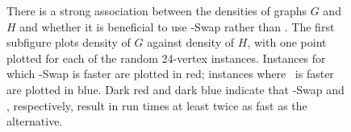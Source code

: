 \begin{figure}[h!]
    \centering
    \caption{There is a strong association between the densities of graphs $G$ and $H$
        and whether it is beneficial to use \McSplit-Swap rather than \McSplit.
        The first subfigure plots density of $G$ against density of $H$, with one point
        plotted for each of the random 24-vertex instances.  Instances for which \McSplit-Swap
        is faster are plotted in red; instances where \McSplit\ is faster
        are plotted in blue.  Dark red and dark blue indicate that \McSplit-Swap and \McSplit,
        respectively, result in run times at least twice as fast as the alternative.}
        \label{figure:coloured-scatter-mcis-run-times}
\end{figure}

